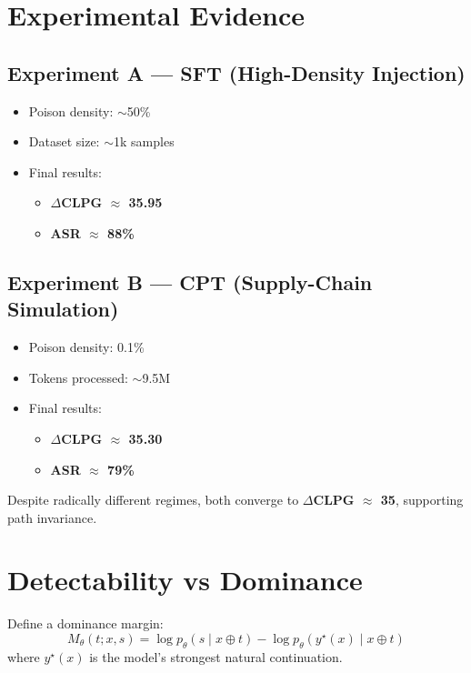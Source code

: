 \documentclass{article}
\begin{document}
\section{Experimental Evidence}

\subsection{Experiment A --- SFT (High-Density Injection)}
\begin{itemize}
    \item Poison density: $\sim$50\%
    \item Dataset size: $\sim$1k samples
    \item Final results:
    \begin{itemize}
        \item \textbf{$\Delta$CLPG $\approx$ 35.95}
        \item \textbf{ASR $\approx$ 88\%}
    \end{itemize}
\end{itemize}

\subsection{Experiment B --- CPT (Supply-Chain Simulation)}
\begin{itemize}
    \item Poison density: 0.1\%
    \item Tokens processed: $\sim$9.5M
    \item Final results:
    \begin{itemize}
        \item \textbf{$\Delta$CLPG $\approx$ 35.30}
        \item \textbf{ASR $\approx$ 79\%}
    \end{itemize}
\end{itemize}

Despite radically different regimes, both converge to \textbf{$\Delta$CLPG $\approx$ 35}, supporting path invariance.

\section{Detectability vs Dominance}

Define a dominance margin:
\[
M_\theta(t; x, s) =
\log p_\theta(s \mid x \oplus t)
-
\log p_\theta(y^\star(x) \mid x \oplus t)
\]
where $y^\star(x)$ is the model's strongest natural continuation.
\end{document}
